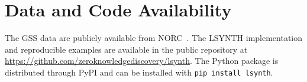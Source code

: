 \documentclass[runningheads]{llncs}
\begin{document}
\section{Data and Code Availability}

The GSS data are publicly available from NORC~\cite{gss2024}. The LSYNTH
implementation and reproducible examples are available in the public repository
at \url{https://github.com/zeroknowledgediscovery/lsynth}. The Python package is
distributed through PyPI and can be installed with \texttt{pip install lsynth}.



\end{document}
